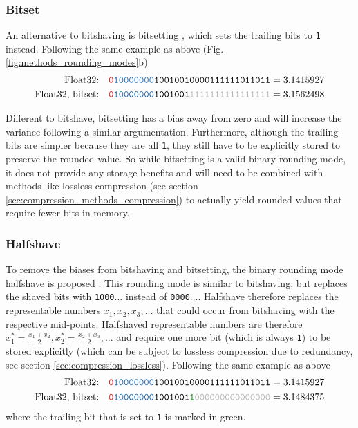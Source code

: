 \subsubsection{Bitset}
An alternative to bitshaving is bitsetting \citep{Zender2016}, which sets the trailing bits to \texttt{1} instead. Following the same
example as above (Fig. \ref{fig:methods_rounding_modes}b)
\begin{align}
	\text{Float32:}& \quad \mathtt{{\color{psign}0}{\color{pexpo}10000000}10010010000111111011011} = 3.1415927 \nonumber \\
	\text{Float32, bitset:}& \quad \mathtt{{\color{psign}0}{\color{pexpo}10000000}1001001{\color{gray}1111111111111111}} = 3.1562498
	\label{eq:bitset}
\end{align}

Different to bitshave, bitsetting has a bias away from zero and will increase the variance following a similar argumentation. Furthermore,
although the trailing bits are simpler because they are all \texttt{1}, they still have to be explicitly stored to preserve the rounded
value. So while bitsetting is a valid binary rounding mode, it does not provide any storage benefits and will need to be combined
with methods like lossless compression (see section \ref{sec:compression_methods_compression}) to actually yield rounded
values that require fewer bits in memory.

\subsubsection{Halfshave}
To remove the biases from bitshaving and bitsetting, the binary rounding mode halfshave is proposed \citep{Zender2016,Kouznetsov2020}.
This rounding mode is similar to bitshaving, but replaces the shaved bits with \texttt{1000$...$} instead of \texttt{0000$...$}.
Halfshave therefore replaces the representable numbers $x_1,x_2,x_3,...$ that could occur from bitshaving with the respective mid-points.
Halfshaved representable numbers are therefore $x_1^* = \tfrac{x_1+x_2}{2}, x_2^* = \tfrac{x_2 + x_3}{2}, ...$ and require
one more bit (which is always \texttt{1}) to be stored explicitly (which can be subject to lossless compression due to redundancy,
see section \ref{sec:compression_lossless}). Following the same example as above
\begin{align}
	\text{Float32:}& \quad \mathtt{{\color{psign}0}{\color{pexpo}10000000}10010010000111111011011} = 3.1415927 \nonumber \\
	\text{Float32, bitset:}& \quad \mathtt{{\color{psign}0}{\color{pexpo}10000000}1001001{\color{mygreen}1}
	{\color{gray}000000000000000}} = 3.1484375
	\label{eq:halfshave}
\end{align}
where the trailing bit that is set to \texttt{1} is marked in green. 

